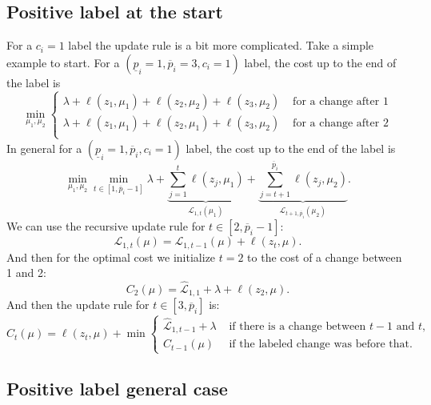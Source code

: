\documentclass{article}
\begin{document}
\subsection{Positive label at the start}
For a $c_i=1$ label the update rule is a bit more complicated. Take a
simple example to start. For a
$(\underline p_i=1,\overline p_i=3,c_i=1)$ label, the cost up to the
end of the label is
\begin{equation}
  \label{eq:positive_cost}
  \min_{\mu_1, \mu_2}
  \begin{cases}
    \lambda+\ell(z_1,\mu_1) + \ell(z_2, \mu_2)+\ell(z_3, \mu_2) &\text{ for a
      change after 1}\\
    \lambda+\ell(z_1,\mu_1) + \ell(z_2, \mu_1)+\ell(z_3, \mu_2) &\text{ for a
      change after 2}\\
  \end{cases}
\end{equation}
In general for a
$(\underline p_i=1,\overline p_i,c_i=1)$ label, the cost up to the end
of the label is
\begin{equation}
  \label{eq:positive_cost}
  \min_{\mu_1, \mu_2}
  \min_{t\in[1, \overline p_i-1]}
\lambda+
  \underbrace{
    \sum_{j=1}^t \ell(z_j, \mu_1)
  }_{\mathcal L_{1,t}(\mu_1)}+
  \underbrace{
    \sum_{j=t+1}^{\overline p_i}\ell(z_j, \mu_2)
  }_{\mathcal L_{t+1,\overline p_i}(\mu_2)}.
\end{equation}
We can use the recursive update rule for $t\in[2,\overline p_i-1]$:
\begin{equation}
  \mathcal L_{1,t}(\mu) = \mathcal L_{1,t-1}(\mu) +\ell(z_t , \mu).
\end{equation}
And then for the optimal cost we initialize $t=2$ to the cost of a
change between 1 and 2:
\begin{equation}
  C_2(\mu)=\mathcal{\hat L}_{1,1}+\lambda+\ell(z_2,\mu).
\end{equation}
And then
the update rule for
$t\in[3, \overline p_i]$ is:
\begin{equation}
  \label{eq:positive_update}
  C_t(\mu)=\ell(z_t, \mu) + \min
  \begin{cases}
\mathcal{\hat L}_{1, t-1}+\lambda &\text{ if there is a change between $t-1$ and $t$,}\\
C_{t-1}(\mu) & \text{ if the labeled change was before that.}
  \end{cases}
\end{equation}
\subsection{Positive label general case}
\end{document}
